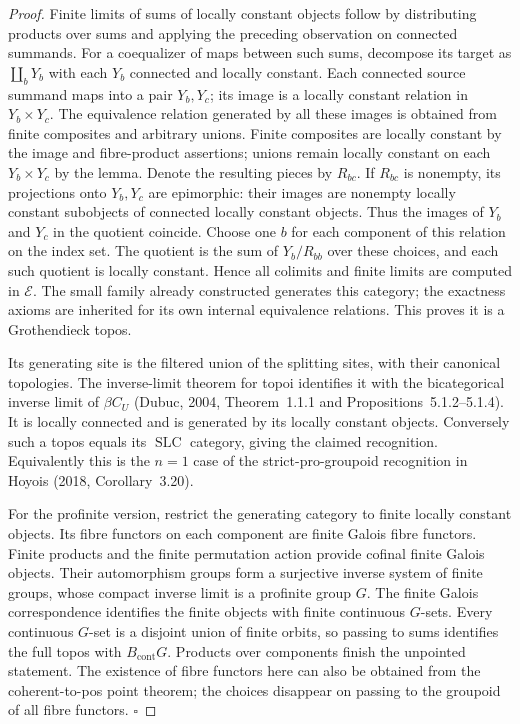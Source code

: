 \begin{proof}
Finite limits of sums of locally constant objects follow by distributing products over sums and applying the preceding observation on connected summands. For a coequalizer of maps between such sums, decompose its target as $\coprod_bY_b$ with each $Y_b$ connected and locally constant. Each connected source summand maps into a pair $Y_b,Y_c$; its image is a locally constant relation in $Y_b\times Y_c$. The equivalence relation generated by all these images is obtained from finite composites and arbitrary unions. Finite composites are locally constant by the image and fibre-product assertions; unions remain locally constant on each $Y_b\times Y_c$ by the lemma. Denote the resulting pieces by $R_{bc}$. If $R_{bc}$ is nonempty, its projections onto $Y_b,Y_c$ are epimorphic: their images are nonempty locally constant subobjects of connected locally constant objects. Thus the images of $Y_b$ and $Y_c$ in the quotient coincide. Choose one $b$ for each component of this relation on the index set. The quotient is the sum of $Y_b/R_{bb}$ over these choices, and each such quotient is locally constant. Hence all colimits and finite limits are computed in $\mathcal E$. The small family already constructed generates this category; the exactness axioms are inherited for its own internal equivalence relations. This proves it is a Grothendieck topos.

Its generating site is the filtered union of the splitting sites, with their canonical topologies. The inverse-limit theorem for topoi identifies it with the bicategorical inverse limit of $\beta C_U$ (Dubuc, 2004, Theorem~1.1.1 and Propositions~5.1.2--5.1.4). It is locally connected and is generated by its locally constant objects. Conversely such a topos equals its $\operatorname{SLC}$ category, giving the claimed recognition. Equivalently this is the $n=1$ case of the strict-pro-groupoid recognition in Hoyois (2018, Corollary~3.20).

For the profinite version, restrict the generating category to finite locally constant objects. Its fibre functors on each component are finite Galois fibre functors. Finite products and the finite permutation action provide cofinal finite Galois objects. Their automorphism groups form a surjective inverse system of finite groups, whose compact inverse limit is a profinite group $G$. The finite Galois correspondence identifies the finite objects with finite continuous $G$-sets. Every continuous $G$-set is a disjoint union of finite orbits, so passing to sums identifies the full topos with $B_{\mathrm{cont}}G$. Products over components finish the unpointed statement. The existence of fibre functors here can also be obtained from the coherent-to-pos point theorem; the choices disappear on passing to the groupoid of all fibre functors. \hfill$\square$
\end{proof}

